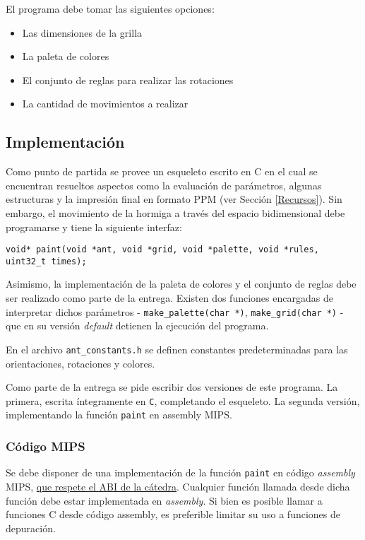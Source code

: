 \documentclass{article}
\begin{document}
El programa debe tomar las siguientes opciones:
\begin{itemize}
\item Las dimensiones de la grilla
\item La paleta de colores
\item El conjunto de reglas para realizar las rotaciones
\item La cantidad de movimientos a realizar
\end{itemize}


\subsection{Implementación}
Como punto de partida se provee un esqueleto escrito en C en el cual se encuentran resueltos aspectos como la evaluación de parámetros, 
algunas estructuras y la impresión final en formato PPM (ver Sección \ref{Recursos}).  Sin embargo, el movimiento de la hormiga a través del
espacio bidimensional debe programarse y tiene la siguiente interfaz:

\begin{small}
\begin{verbatim}
void* paint(void *ant, void *grid, void *palette, void *rules,  uint32_t times);
\end{verbatim}
\end{small}

Asimismo, la implementación de la paleta de colores y el conjunto de reglas debe ser realizado como parte de la entrega. Existen dos funciones
encargadas de interpretar dichos parámetros - \texttt{make\_palette(char *)}, \texttt{make\_grid(char *)} - que en su versión \textit{default}
detienen la ejecución del programa.

En el archivo \texttt{ant\_constants.h} se definen constantes predeterminadas para las orientaciones, rotaciones y colores. 

Como parte de la entrega se pide escribir dos versiones de este programa. La primera, escrita íntegramente en \texttt{C}, completando
el esqueleto. La segunda versión, implementando la función \texttt{paint} en assembly MIPS.

\subsubsection{Código MIPS}
Se debe disponer de una implementación de la función \texttt{paint} en código \textit{assembly} MIPS, \underline{que respete el ABI 
de la cátedra}. Cualquier función llamada desde dicha función debe estar implementada en \textit{assembly}. Si bien es posible llamar a
funciones C desde código assembly, es preferible limitar su uso a funciones de depuración.
\end{document}

